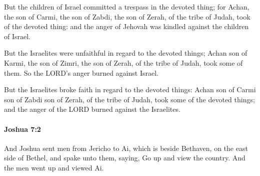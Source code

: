 			\begin{versebox}
					\item[BHS] 
					\item[ASV] But the children of Israel committed a trespass in the devoted thing; for Achan, the son of Carmi, the son of Zabdi, the son of Zerah, of the tribe of Judah, took of the devoted thing: and the anger of Jehovah was kindled against the children of Israel.
					\item[NIV] But the Israelites were unfaithful in regard to the devoted things; Achan son of Karmi, the son of Zimri, the son of Zerah, of the tribe of Judah, took some of them. So the LORD’s anger burned against Israel.
					\item[NRSV] But the Israelites broke faith in regard to the devoted things: Achan son of Carmi son of Zabdi son of Zerah, of the tribe of Judah, took some of the devoted things; and the anger of the LORD burned against the Israelites.
			\end{versebox}

		\paragraph{Joshua 7:2} %
			\label{JOSHUA-7-2}

			And Joshua sent men from Jericho to Ai, which is beside Bethaven, on the east side of Bethel, and spake unto them, saying, Go up and view the country.  And the men went up and viewed Ai.


